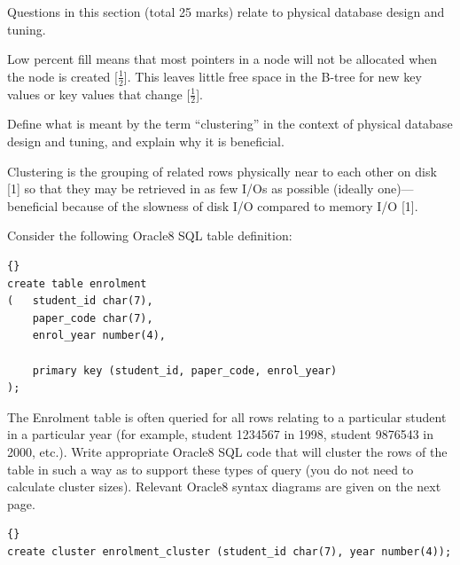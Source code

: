 \documentclass{ouexam}
\begin{document}
\begin{examsection}{25}{}{Questions in this section (total 25 marks) relate to
physical database design and tuning.}
\begin{question}{10}
\begin{subquestion}{4}
\begin{subsubquestion}{2}
\begin{marking}
				Low percent fill means that most pointers in a node will not be
				allocated when the node is created [$\frac{1}{2}$]. This leaves
				little free space in the B-tree for new key values or key
				values that change [$\frac{1}{2}$].
			\end{marking}
		\end{subsubquestion}
	\end{subquestion}
	

\end{question}
	

\begin{question}{5}\label{clusterq}


	\begin{subquestion}{2}
		Define what is meant by the term ``clustering'' in the context of
		physical database design and tuning, and explain why it is beneficial.
		\begin{marking}
			Clustering is the grouping of related rows physically near to each
			other on disk [1] so that they may be retrieved in as few I/Os as
			possible (ideally one)---beneficial because of the slowness of disk
			I/O compared to memory I/O [1].
		\end{marking}
	\end{subquestion}
	

	\begin{subquestion}{3}\label{clusterqcode}
		Consider the following Oracle8 SQL table definition:
		
		\begin{lstlisting}[language={[Oracle8]SQL}]{}
create table enrolment
(	student_id char(7),
	paper_code char(7),
	enrol_year number(4),
  
	primary key (student_id, paper_code, enrol_year)
);
		\end{lstlisting}

		The \textsf{Enrolment} table is often queried for all rows relating to
		a particular student in a particular year (for example, student 1234567
		in 1998, student 9876543 in 2000, etc.). Write appropriate Oracle8 SQL
		code that will cluster the rows of the table in such a way as to
		support these types of query (you do not need to calculate cluster
		sizes). Relevant Oracle8 syntax diagrams are given on the next page.
		\begin{marking}
			\begin{lstlisting}[language={[Oracle8]SQL}]{}
create cluster enrolment_cluster (student_id char(7), year number(4));


\end{lstlisting}
\end{marking}
\end{subquestion}
\end{question}
\end{examsection}
\end{document}
